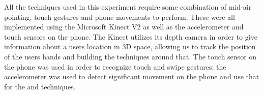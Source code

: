 All the techniques used in this experiment require some combination of mid-air pointing, touch gestures and phone movements to perform. 
These were all implemented using the Microsoft Kinect V2 as well as the accelerometer and touch sensors on the phone. 
The Kinect utilizes its depth camera in order to give information about a users location in 3D space, allowing us to track the position of the users hands and building the techniques around that. 
The touch sensor on the phone was used in order to recognize touch and swipe gestures; the accelerometer was used to detect significant movement on the phone and use that for the \tilt and \throw techniques. 